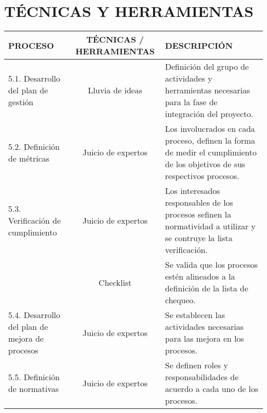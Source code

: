 \chapter{T\'ECNICAS Y HERRAMIENTAS}
%
\begin{table}[H]
	\centering
	\begin{tabular}{| m{5cm} | c | p{5cm} |}
	\hline
	\rowcolor{LightGrey}
	\textbf{PROCESO} & \textbf{T\'ECNICAS / HERRAMIENTAS} & \textbf{DESCRIPCI\'ON} \\ \hline
	5.1. Desarrollo del plan de gesti\'on & Lluvia de ideas & Definici\'on del grupo de actividades y herramientas 
	necesarias para la fase de integraci\'on del proyecto.\\
	\hline
	5.2. Definici\'on de m\'etricas & Juicio de expertos & Los involucrados en cada proceso, definen la forma de
	medir el cumplimiento de los objetivos de sus respectivos procesos.\\
	\hline
	5.3. Verificaci\'on de cumplimiento & Juicio de expertos & Los interesados responsables de los procesos
	sefinen la normatividad a utilizar y se contruye la lista verificaci\'on.\\
	\cline{2-3}
	& Checklist & Se valida que los procesos est\'en alineados a la definici\'on de la lista de chequeo.\\
	\hline
	5.4. Desarrollo del plan de mejora de procesos & Juicio de expertos & Se establecen las actividades necesarias 
	para las mejora en los procesos.\\
	\hline
	5.5. Definici\'on de normativas & Juicio de expertos & Se definen roles y responsabilidades de acuerdo
	a cada uno de los procesos.\\
	\hline
	\end{tabular}
	
\end{table}